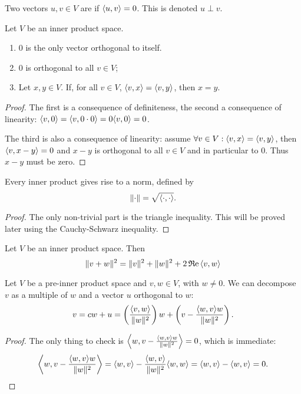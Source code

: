\begin{definition}
Two vectors $u,v \in V$ are  if $\inner{u,v} =0$. This is denoted $u\perp v$.
\end{definition}
\begin{lemma} \label{elementaryOrthogonality}
Let $V$ be an inner product space.
\begin{enumerate}
\item $0$ is the only vector orthogonal to itself.
\item $0$ is orthogonal to all $v\in V$;
\item Let $x,y\in V$. If, for all $v\in V$, $\inner{v,x} = \inner{v,y}$, then $x=y$.
\end{enumerate}\end{lemma}
\begin{proof}
The first is a consequence of definiteness, the second a consequence of linearity: $\inner{v,0} = \inner{v,0\cdot0} = 0\inner{v,0} = 0$.

The third is also a consequence of linearity: assume $\forall v\in V: \inner{v,x} = \inner{v,y}$, then $\inner{v,x-y}=0$ and $x-y$ is orthogonal to all $v\in V$ and in particular to $0$. Thus $x-y$ must be zero.
\end{proof}

\begin{proposition}
Every inner product gives rise to a norm, defined by
\[ \norm{\cdot} = \sqrt{\inner{\cdot,\cdot}}. \]
\end{proposition}
\begin{proof}
The only non-trivial part is the triangle inequality. This will be proved later using the Cauchy-Schwarz inequality.
\end{proof}


\begin{lemma}
Let $V$ be an inner product space. Then
\[ \norm{v+w}^2 = \norm{v}^2+\norm{w}^2+2\Re\inner{v,w} \]
\end{lemma}
\begin{lemma} \label{orthogonalDecomposition}
Let $V$ be a pre-inner product space and $v,w\in V$, with $w\neq 0$. We can decompose $v$ as a multiple of $w$ and a vector $u$ orthogonal to $w$:
\[ v = cw+u = \left(\frac{\inner{v,w}}{\norm{w}^2}\right)w + \left( v- \frac{\inner{w, v}w}{\norm{w}^2} \right). \]
\end{lemma}
\begin{proof}
The only thing to check is $\inner{w, v- \frac{\inner{w,v}w}{\norm{w}^2}} = 0$, which is immediate:
\[ \inner{w, v- \frac{\inner{w,v}w}{\norm{w}^2}} = \inner{w,v} - \frac{\inner{w,v}}{\norm{w}^2}\inner{w,w} = \inner{w,v} - \inner{w,v} = 0. \]
\end{proof}

